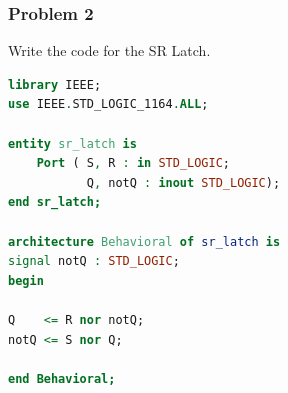 \documentclass[11pt]{article}
\begin{document}
\subsubsection{Problem 2}
Write the code for the SR Latch.

\begin{lstlisting}[language=VHDL]
library IEEE;
use IEEE.STD_LOGIC_1164.ALL;

entity sr_latch is
    Port ( S, R : in STD_LOGIC;
           Q, notQ : inout STD_LOGIC);
end sr_latch;

architecture Behavioral of sr_latch is
signal notQ : STD_LOGIC;
begin

Q    <= R nor notQ;
notQ <= S nor Q;

end Behavioral;
\end{lstlisting}
\end{document}
